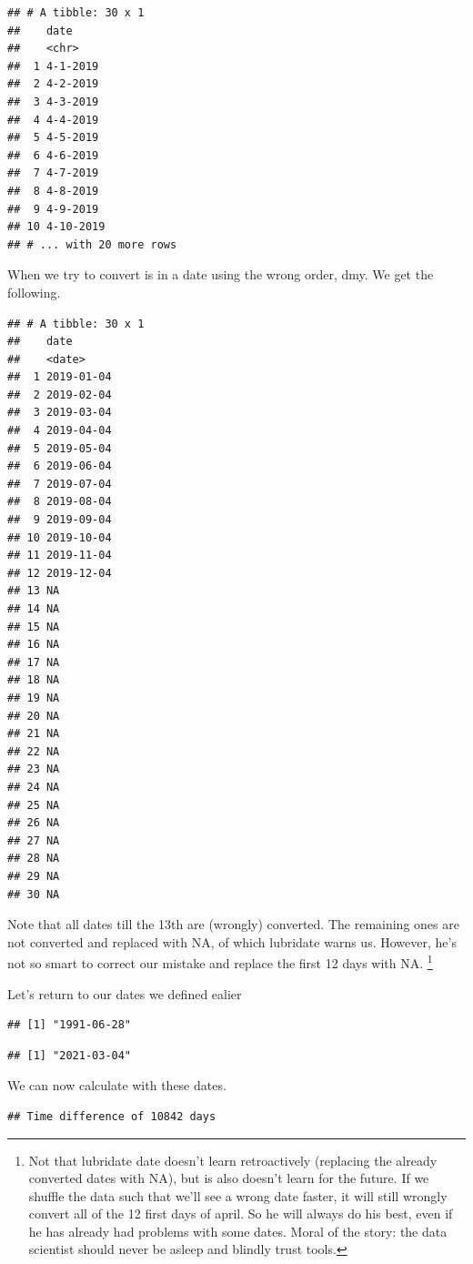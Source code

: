 \documentclass[]{tufte-book}
\begin{document}
\begin{verbatim}
## # A tibble: 30 x 1
##    date     
##    <chr>    
##  1 4-1-2019 
##  2 4-2-2019 
##  3 4-3-2019 
##  4 4-4-2019 
##  5 4-5-2019 
##  6 4-6-2019 
##  7 4-7-2019 
##  8 4-8-2019 
##  9 4-9-2019 
## 10 4-10-2019
## # ... with 20 more rows
\end{verbatim}

When we try to convert is in a date using the wrong order, dmy. We get the following.

\begin{verbatim}
## # A tibble: 30 x 1
##    date      
##    <date>    
##  1 2019-01-04
##  2 2019-02-04
##  3 2019-03-04
##  4 2019-04-04
##  5 2019-05-04
##  6 2019-06-04
##  7 2019-07-04
##  8 2019-08-04
##  9 2019-09-04
## 10 2019-10-04
## 11 2019-11-04
## 12 2019-12-04
## 13 NA        
## 14 NA        
## 15 NA        
## 16 NA        
## 17 NA        
## 18 NA        
## 19 NA        
## 20 NA        
## 21 NA        
## 22 NA        
## 23 NA        
## 24 NA        
## 25 NA        
## 26 NA        
## 27 NA        
## 28 NA        
## 29 NA        
## 30 NA
\end{verbatim}

Note that all dates till the 13th are (wrongly) converted. The remaining ones are not converted and replaced with NA, of which lubridate warns us. However, he's not so smart to correct our mistake and replace the first 12 days with NA. \footnote{Not that lubridate date doesn't learn retroactively (replacing the already converted dates with NA), but is also doesn't learn for the future. If we shuffle the data such that we'll see a wrong date faster, it will still wrongly convert all of the 12 first days of april. So he will always do his best, even if he has already had problems with some dates. Moral of the story: the data scientist should never be asleep and blindly trust tools.}

Let's return to our dates we defined ealier

\begin{verbatim}
## [1] "1991-06-28"
\end{verbatim}

\begin{verbatim}
## [1] "2021-03-04"
\end{verbatim}

We can now calculate with these dates.

\begin{verbatim}
## Time difference of 10842 days
\end{verbatim}
\end{document}
